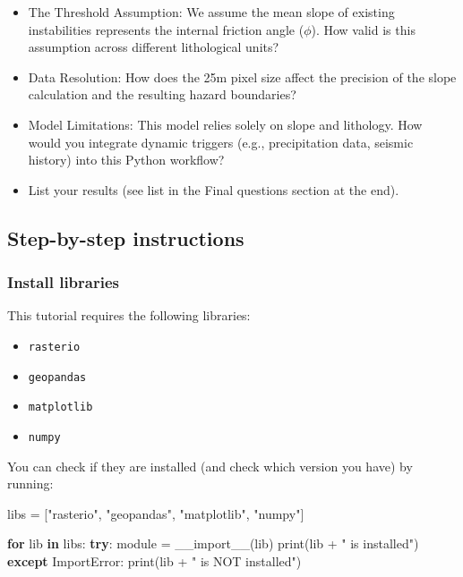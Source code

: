 \documentclass[
  letterpaper,
  DIV=11,
  numbers=noendperiod]{scrartcl}
\newenvironment{Shaded}{\begin{snugshade}}{\end{snugshade}}
\newcommand{\BuiltInTok}[1]{\textcolor[rgb]{0.00,0.23,0.31}{#1}}
\newcommand{\ControlFlowTok}[1]{\textcolor[rgb]{0.00,0.23,0.31}{\textbf{#1}}}
\newcommand{\KeywordTok}[1]{\textcolor[rgb]{0.00,0.23,0.31}{\textbf{#1}}}
\newcommand{\NormalTok}[1]{\textcolor[rgb]{0.00,0.23,0.31}{#1}}
\newcommand{\OperatorTok}[1]{\textcolor[rgb]{0.37,0.37,0.37}{#1}}
\newcommand{\PreprocessorTok}[1]{\textcolor[rgb]{0.68,0.00,0.00}{#1}}
\newcommand{\StringTok}[1]{\textcolor[rgb]{0.13,0.47,0.30}{#1}}
\providecommand{\tightlist}{%
  \setlength{\itemsep}{0pt}\setlength{\parskip}{0pt}}
\begin{document}
\begin{tcolorbox}
\begin{itemize}
\tightlist
\item
  The Threshold Assumption: We assume the mean slope of existing
  instabilities represents the internal friction angle (\(\phi\)). How
  valid is this assumption across different lithological units?
\item
  Data Resolution: How does the 25m pixel size affect the precision of
  the slope calculation and the resulting hazard boundaries?
\item
  Model Limitations: This model relies solely on slope and lithology.
  How would you integrate dynamic triggers (e.g., precipitation data,
  seismic history) into this Python workflow?
\item
  List your results (see list in the Final questions section at the
  end).
\end{itemize}

\end{tcolorbox}

\subsection{Step-by-step instructions}\label{step-by-step-instructions}

\subsubsection{Install libraries}\label{install-libraries}

This tutorial requires the following libraries:

\begin{itemize}
\tightlist
\item
  \texttt{rasterio}
\item
  \texttt{geopandas}
\item
  \texttt{matplotlib}
\item
  \texttt{numpy}
\end{itemize}

You can check if they are installed (and check which version you have)
by running:

\begin{Shaded}
\begin{Highlighting}[]
\NormalTok{libs }\OperatorTok{=}\NormalTok{ [}\StringTok{"rasterio"}\NormalTok{, }\StringTok{"geopandas"}\NormalTok{, }\StringTok{"matplotlib"}\NormalTok{, }\StringTok{"numpy"}\NormalTok{]}

\ControlFlowTok{for}\NormalTok{ lib }\KeywordTok{in}\NormalTok{ libs:}
    \ControlFlowTok{try}\NormalTok{:}
\NormalTok{        module }\OperatorTok{=} \BuiltInTok{\_\_import\_\_}\NormalTok{(lib)}
        \BuiltInTok{print}\NormalTok{(lib }\OperatorTok{+} \StringTok{" is installed"}\NormalTok{)}
    \ControlFlowTok{except} \PreprocessorTok{ImportError}\NormalTok{:}
        \BuiltInTok{print}\NormalTok{(lib }\OperatorTok{+} \StringTok{" is NOT installed"}\NormalTok{)}
\end{Highlighting}
\end{Shaded}
\end{document}
